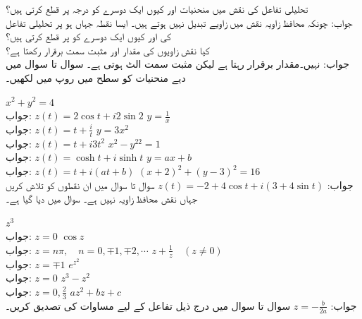 تحلیلی تفاعل کی نقش میں منحنیات  اور   کیوں ایک دوسرے کو  درجہ پر قطع کرتی ہیں؟\\
جواب:\quad
چونکہ محافظ زاویہ نقش میں زاویے تبدیل نہیں ہوتے ہیں۔
ایسا نقطہ جہاں  ہو پر تحلیلی تفاعل  کی   اور  کیوں ایک دوسرے کو  پر قطع کرتی ہیں؟\\
کیا نقش   زاویوں کی مقدار اور مثبت سمت برقرار رکھتا ہے؟\\
جواب:\quad
نہیں۔مقدار برقرار رہتا ہے لیکن مثبت سمت الٹ ہوتی ہے۔
سوال  تا سوال  میں دیے منحنیات کو  سطح  میں  روپ میں لکھیں۔

\quad
$x^2+y^2=4$\\
جواب:\quad
$z(t)=2\cos t+i2\sin 2$
\quad
$y=\tfrac{1}{x}$\\
جواب:\quad
$z(t)=t+\tfrac{i}{t}$
\quad
$y=3x^2$\\
جواب:\quad
$z(t)=t+i3t^2$
\quad
$x^2-y^22=1$\\
جواب:\quad
$z(t)=\cosh t+i\sinh t$
\quad
$y=ax+b$\\
جواب:\quad
$z(t)=t+i(at+b)$
\quad
$(x+2)^2+(y-3)^2=16$\\
جواب:\quad
$z(t)=-2+4\cos t+i(3+4\sin t)$
سوال  تا سوال  میں ان نقطوں کو تلاش کریں جہاں نقش   محافظ زاویہ نہیں ہے۔ سوال میں دیا گیا ہے۔ 

\quad
$z^3$\\
جواب:\quad
$z=0$
\quad
$\cos z$\\
جواب:\quad
$z=n\pi,\quad n=0,\mp 1,\mp 2,\cdots$
\quad
$z+\tfrac{1}{z}\quad (z\ne 0)$\\
جواب:\quad
$z=\mp 1$
\quad
$e^{z^2}$\\
جواب:\quad
$z=0$
\quad
$z^3-z^2$\\
جواب:\quad
$z=0, \tfrac{2}{3}$
\quad
$az^2+bz+c$\\
جواب:\quad
$z=-\tfrac{b}{2a}$
سوال  تا سوال   میں  درج ذیل تفاعل  کے لیے مساوات  کی تصدیق کریں۔

